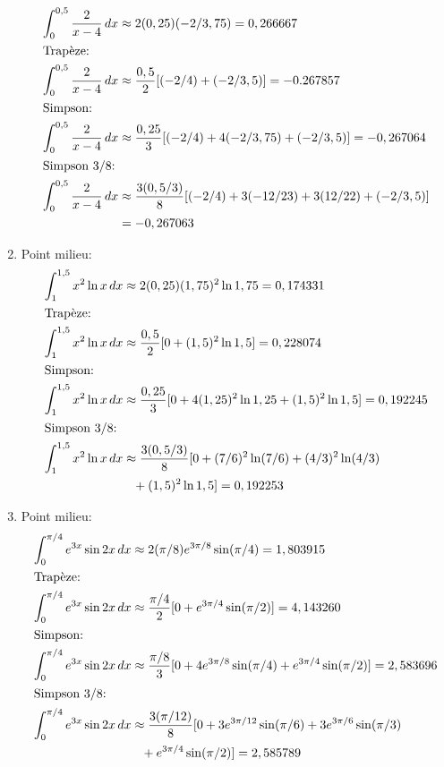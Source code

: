 \begin{exercice}
\begin{sol}
\begin{enumerate}
\begin{align*}
        \int_0^{0,5} \frac{2}{x - 4}\, dx &\approx
        2(0,25) (-2/3,75) = 0,266667 \\
        \intertext{Trapèze:}
        \int_0^{0,5} \frac{2}{x - 4}\, dx &\approx
        \frac{0,5}{2} [(-2/4) + (-2/3,5)] = -0.267857 \\
        \intertext{Simpson:}
        \int_0^{0,5} \frac{2}{x - 4}\, dx &\approx
        \frac{0,25}{3} [(-2/4) + 4(-2/3,75) + (-2/3,5)] = -0,267064 \\
        \intertext{Simpson 3/8:}
        \int_0^{0,5} \frac{2}{x - 4}\, dx &\approx
        \frac{3(0,5/3)}{8} [(-2/4) + 3(-12/23) + 3(12/22) + (-2/3,5)]
        \\
        &= -0,267063
      \end{align*}
    \item Point milieu:
      \begin{align*}
        \int_1^{1,5} x^2 \ln x\, dx &\approx
        2(0,25) (1,75)^2 \ln 1,75 = 0,174331 \\
        \intertext{Trapèze:}
        \int_1^{1,5} x^2 \ln x\, dx &\approx
        \frac{0,5}{2} [0 + (1,5)^2 \ln 1,5] = 0,228074 \\
        \intertext{Simpson:}
        \int_1^{1,5} x^2 \ln x\, dx &\approx
        \frac{0,25}{3} [0 + 4 (1,25)^2 \ln 1,25 + (1,5)^2 \ln 1,5] = 0,192245 \\
        \intertext{Simpson 3/8:}
        \int_1^{1,5} x^2 \ln x\, dx &\approx
        \frac{3(0,5/3)}{8} [0 + (7/6)^2 \ln (7/6) + (4/3)^2 \ln (4/3) \\
        &\phantom{\approx} + (1,5)^2 \ln 1,5] = 0,192253
      \end{align*}
    \item Point milieu:
      \begin{align*}
        \int_0^{\pi/4} e^{3x} \sin 2x\, dx &\approx
        2(\pi/8) e^{3\pi/8} \sin (\pi/4) = 1,803915 \\
        \intertext{Trapèze:}
        \int_0^{\pi/4} e^{3x} \sin 2x\, dx &\approx
        \frac{\pi/4}{2} [0 + e^{3\pi/4} \sin (\pi/2)] = 4,143260 \\
        \intertext{Simpson:}
        \int_0^{\pi/4} e^{3x} \sin 2x\, dx &\approx
        \frac{\pi/8}{3} [0 + 4 e^{3\pi/8} \sin (\pi/4) + e^{3\pi/4} \sin (\pi/2)] = 2,583696 \\
        \intertext{Simpson 3/8:}
        \int_0^{\pi/4} e^{3x} \sin 2x\, dx &\approx
        \frac{3(\pi/12)}{8} [0 + 3 e^{3\pi/12} \sin (\pi/6) + 3
        e^{3\pi/6} \sin (\pi/3) \\
        &\phantom{\approx} + e^{3\pi/4} \sin (\pi/2)] = 2,585789
      \end{align*}
    \end{enumerate}
  \end{sol}
\end{exercice}

